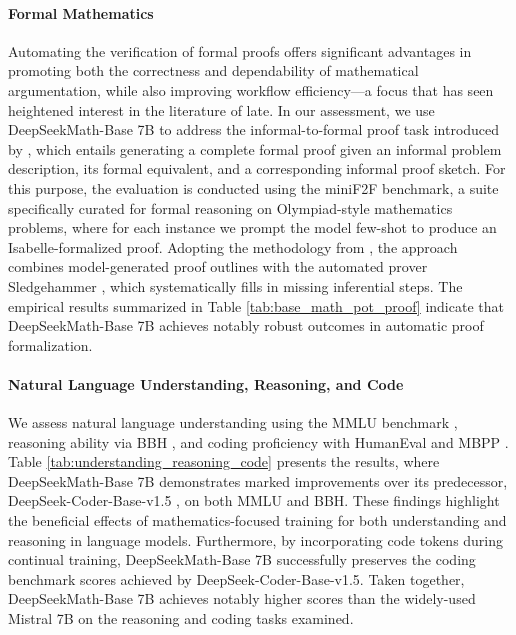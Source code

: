 \begin{itemize}[topsep=0pt]
\paragraph{Formal Mathematics}

Automating the verification of formal proofs offers significant advantages in promoting both the correctness and dependability of mathematical argumentation, while also improving workflow efficiency—a focus that has seen heightened interest in the literature of late. In our assessment, we use DeepSeekMath-Base 7B to address the informal-to-formal proof task introduced by \citep{dsp_proof}, which entails generating a complete formal proof given an informal problem description, its formal equivalent, and a corresponding informal proof sketch. For this purpose, the evaluation is conducted using the miniF2F \citep{minif2f} benchmark, a suite specifically curated for formal reasoning on Olympiad-style mathematics problems, where for each instance we prompt the model few-shot to produce an Isabelle-formalized proof. Adopting the methodology from \cite{dsp_proof}, the approach combines model-generated proof outlines with the automated prover Sledgehammer \citep{sledgehammer}, which systematically fills in missing inferential steps. The empirical results summarized in Table \ref{tab:base_math_pot_proof} indicate that DeepSeekMath-Base 7B achieves notably robust outcomes in automatic proof formalization.

\paragraph{Natural Language Understanding, Reasoning, and Code}

We assess natural language understanding using the MMLU benchmark \citep{mmlu}, reasoning ability via BBH \citep{bbh}, and coding proficiency with HumanEval \citep{codex} and MBPP \citep{mbpp}. Table \ref{tab:understanding_reasoning_code} presents the results, where DeepSeekMath-Base 7B demonstrates marked improvements over its predecessor, DeepSeek-Coder-Base-v1.5 \citep{deepseek-coder}, on both MMLU and BBH. These findings highlight the beneficial effects of mathematics-focused training for both understanding and reasoning in language models. Furthermore, by incorporating code tokens during continual training, DeepSeekMath-Base 7B successfully preserves the coding benchmark scores achieved by DeepSeek-Coder-Base-v1.5. Taken together, DeepSeekMath-Base 7B achieves notably higher scores than the widely-used Mistral 7B \citep{mistral} on the reasoning and coding tasks examined.


\end{itemize}
